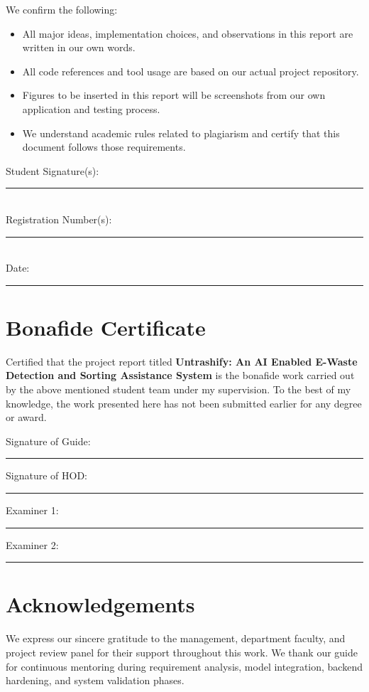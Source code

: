\documentclass[12pt,a4paper]{report}
\begin{document}
We confirm the following:
\begin{itemize}[leftmargin=2em]
    \item All major ideas, implementation choices, and observations in this report are written in our own words.
    \item All code references and tool usage are based on our actual project repository.
    \item Figures to be inserted in this report will be screenshots from our own application and testing process.
    \item We understand academic rules related to plagiarism and certify that this document follows those requirements.
\end{itemize}

\vspace{1cm}
\noindent Student Signature(s): \rule{0.6\textwidth}{0.4pt}\\
Registration Number(s): \rule{0.6\textwidth}{0.4pt}\\
Date: \rule{0.4\textwidth}{0.4pt}

\chapter*{Bonafide Certificate}
Certified that the project report titled \textbf{Untrashify: An AI Enabled E-Waste Detection and Sorting Assistance System} is the bonafide work carried out by the above mentioned student team under my supervision. To the best of my knowledge, the work presented here has not been submitted earlier for any degree or award.

\vspace{1.5cm}
\noindent Signature of Guide: \rule{0.35\textwidth}{0.4pt}\hfill Signature of HOD: \rule{0.35\textwidth}{0.4pt}

\vspace{1cm}
\noindent Examiner 1: \rule{0.35\textwidth}{0.4pt}\hfill Examiner 2: \rule{0.35\textwidth}{0.4pt}

\chapter*{Acknowledgements}
We express our sincere gratitude to the management, department faculty, and project review panel for their support throughout this work. We thank our guide for continuous mentoring during requirement analysis, model integration, backend hardening, and system validation phases.
\end{document}
